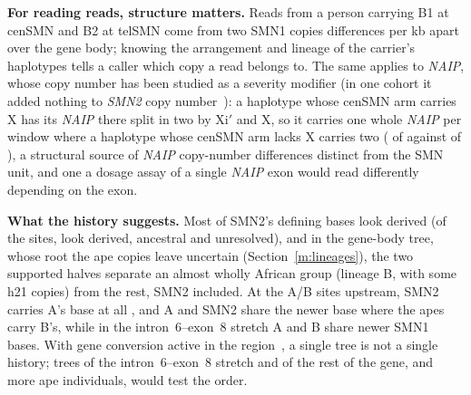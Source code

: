 \documentclass[10pt]{article}
\begin{document}
\textbf{For reading reads, structure matters.} Reads from a person carrying B1 at cenSMN and B2 at telSMN come from two
SMN1 copies \gsBoneBtwo{} differences per kb apart over the gene body; knowing the arrangement and lineage of the
carrier's haplotypes tells a caller which copy a read belongs to. The same applies to \emph{NAIP}, whose copy number has been studied as a severity modifier (in one cohort it added nothing to \emph{SMN2} copy number~\cite{wadman2020}): a
haplotype whose cenSMN arm carries X has its \emph{NAIP} there split in two by Xi$'$ and X, so it carries one whole \emph{NAIP}
per window where a haplotype whose cenSMN arm lacks X carries two (\elNaipOneWholeCOne{} of \elCOne{} against \elNaipTwoWholeCZero{}
of \elCZero), a structural source of \emph{NAIP} copy-number differences distinct from the SMN unit, and one a dosage
assay of a single \emph{NAIP} exon would read differently depending on the exon.

\textbf{What the history suggests.} Most of SMN2's defining bases look derived (of the \evS{} sites, \evSancOne{} look derived, \evSancTwo{} ancestral and \evSunres{} unresolved), and in the gene-body tree, whose root the ape copies leave uncertain (Section~\ref{m:lineages}), the two supported halves separate an almost wholly African group (lineage B, with some h21 copies) from the rest, SMN2 included. At the A/B sites upstream, SMN2 carries A's base at all \evABtwoEqA, and A and SMN2 share
the newer base where the apes carry B's, while in the intron~6--exon~8 stretch A and B share newer SMN1 bases. With gene conversion active in the
region~\cite{campbell1997,vandersteege1996,suzuki2026}, a single tree is not a single history; trees of the intron~6--exon~8
stretch and of the rest of the gene, and more ape individuals, would test the order.
\end{document}
